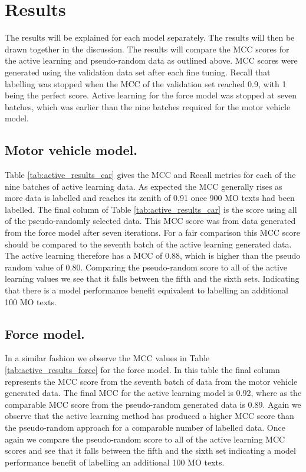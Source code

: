 \section{Results} The results will be explained for each model separately. The results will then be drawn together in the discussion. The results will compare the MCC scores for the active learning and pseudo-random data as outlined above. MCC scores were generated using the validation data set after each fine tuning. Recall that labelling was stopped when the MCC of the validation set reached 0.9, with 1 being the perfect score. Active learning for the force model was stopped at seven batches, which was earlier than the nine batches required for the motor vehicle model.

\subsection{Motor vehicle model.} Table \ref{tab:active_results_car} gives the MCC and Recall metrics for each of the nine batches of active learning data. As expected the MCC generally rises as more data is labelled and reaches its zenith of 0.91 once 900 MO texts had been labelled. The final column of Table \ref{tab:active_results_car}  is the score using all of the pseudo-randomly selected data. This MCC score was from data generated from the force model after seven iterations. For a fair comparison this MCC score should be compared to the seventh batch of the active learning generated data. The active learning therefore has a MCC of 0.88, which is higher than the pseudo random value of 0.80. Comparing the pseudo-random score to all of the active learning values we see that it falls between the fifth and the sixth sets. Indicating that there is a model performance benefit equivalent to labelling an additional 100 MO texts.

\subsection{Force model.} In a similar fashion we observe the MCC values in Table \ref{tab:active_results_force} for the force model. In this table the final column represents the MCC score from the seventh batch of data from the motor vehicle generated data. The final MCC for the active learning model is 0.92, where as the comparable MCC score from the pseudo-random generated data is 0.89. Again we observe that the active learning method has produced a higher MCC score than the pseudo-random approach for a comparable number of labelled data.  Once again we compare the pseudo-random score to all of the active learning MCC scores and see that it falls between the fifth and the sixth set indicating a model performance benefit of labelling an additional 100 MO texts.





